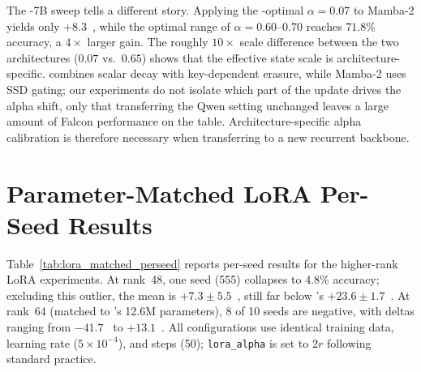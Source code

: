 \documentclass{article}
\begin{document}
The \falcon-7B sweep tells a different story.
Applying the \gdn-optimal $\alpha{=}0.07$ to Mamba-2 yields only $+8.3$~\pp, while the optimal range of $\alpha{=}0.60$--$0.70$ reaches $71.8\%$ accuracy, a $4\times$ larger gain.
The roughly $10\times$ scale difference between the two architectures ($0.07$ vs.\ $0.65$) shows that the effective state scale is architecture-specific. \gdn combines scalar decay with key-dependent erasure, while Mamba-2 uses SSD gating; our experiments do not isolate which part of the update drives the alpha shift, only that transferring the Qwen setting unchanged leaves a large amount of Falcon performance on the table.
Architecture-specific alpha calibration is therefore necessary when transferring \method to a new recurrent backbone.

\section{Parameter-Matched LoRA Per-Seed Results}
\label{app:matched_perseed}

Table~\ref{tab:lora_matched_perseed} reports
per-seed results for the higher-rank LoRA experiments. At rank~48, one seed
(555) collapses to 4.8\% accuracy; excluding this outlier, the mean is
$+7.3 \pm 5.5$~\pp, still far below \methodshort's $+23.6 \pm 1.7$~\pp. At
rank~64 (matched to \methodshort's 12.6M parameters), 8 of 10 seeds are
negative, with deltas ranging from $-41.7$~\pp{} to $+13.1$~\pp. All
configurations use identical training data, learning rate ($5 \times 10^{-4}$),
and steps (50); \texttt{lora\_alpha} is set to $2r$ following standard practice.
\end{document}

